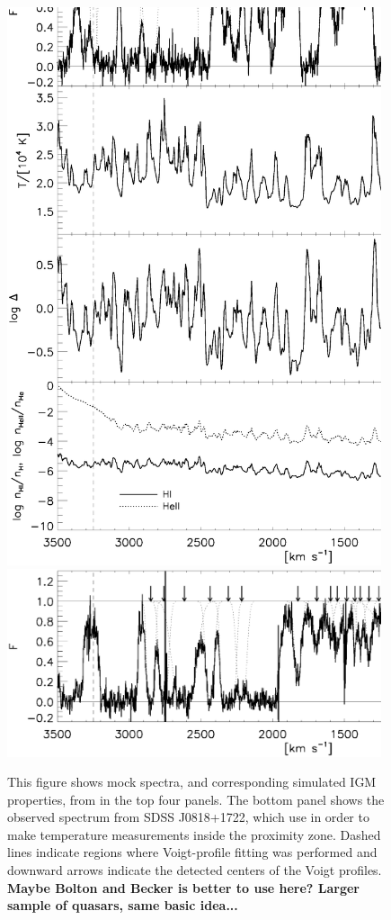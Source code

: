 
\begin{figure}[h]
  \centering
  \includegraphics[width=11cm]{BoltonIGMTemperature_Fig2.ps}
  \includegraphics[width=11cm]{BoltonIGMTemperature_Fig2b.ps}
  \caption{This figure shows mock spectra, and corresponding simulated IGM properties, from \cite{BoltonQuasar} in the top four panels. The bottom panel shows the observed spectrum from SDSS J0818+1722, which \cite{BoltonQuasar} use in order to make temperature measurements inside the proximity zone. Dashed lines indicate regions where Voigt-profile fitting was performed and downward arrows indicate the detected centers of the Voigt profiles. {\bf Maybe Bolton and Becker is better to use here? Larger sample of quasars, same basic idea...}}
  \label{fig:QuasarProximityTemp}
\end{figure}


